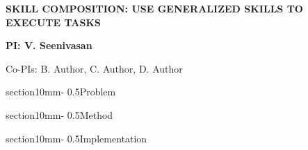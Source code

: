 \documentclass[11pt,a4paper]{article}
\makeatletter
\renewcommand{\section}{\@startsection%
{section}{1}{0mm}{-\baselineskip}%
{0.5\baselineskip}{\normalfont\Large\bfseries}}%
\makeatother
\begin{document}


\pagestyle{plain}

\begin{center} 
\bfseries\uppercase{Skill Composition: use generalized skills to execute tasks}
\end{center}
\vspace{-0.3cm}
\centerline{\bf PI: {V. Seenivasan}}
\centerline{Co-PIs: {B. Author, C. Author, D. Author}}


\begin{abstract}
    dfsgfsh
\end{abstract}

\section{Problem}
    

\section{Method}
    

\section{Implementation}
    
\end{document}
